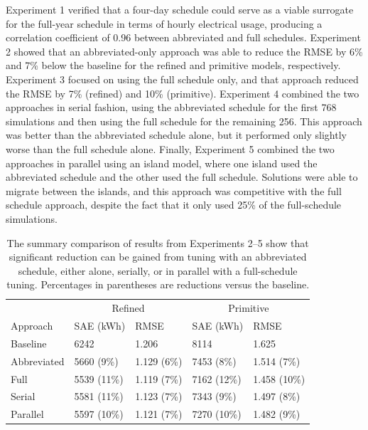 \documentclass[preprint, review, 12pt]{elsarticle}
\begin{document}
Experiment 1 verified that a four-day schedule could serve as a viable surrogate for the full-year schedule in terms of hourly electrical usage, producing a correlation coefficient of 0.96 between abbreviated and full schedules. Experiment 2 showed that an abbreviated-only approach was able to reduce the RMSE by 6\% and 7\% below the baseline for the refined and primitive models, respectively. Experiment 3 focused on using the full schedule only, and that approach reduced the RMSE by 7\% (refined) and 10\% (primitive). Experiment 4 combined the two approaches in serial fashion, using the abbreviated schedule for the first 768 simulations and then using the full schedule for the remaining 256. This approach was better than the abbreviated schedule alone, but it performed only slightly worse than the full schedule alone. Finally, Experiment 5 combined the two approaches in parallel using an island model, where one island used the abbreviated schedule and the other used the full schedule. Solutions were able to migrate between the islands, and this approach was competitive with the full schedule approach, despite the fact that it only used 25\% of the full-schedule simulations.


\begin{table}[tbp]
\centering
\caption{The summary comparison of results from Experiments 2--5 show that significant reduction can be gained from tuning with an abbreviated schedule, either alone, serially, or in parallel with a full-schedule tuning. Percentages in parentheses are reductions versus the baseline.}
\label{tab:hourly-summary}
\begin{tabular}{lllll}
\toprule
 &  \multicolumn{2}{c}{Refined} & \multicolumn{2}{c}{Primitive}\\
Approach & SAE (kWh) & RMSE & SAE (kWh) & RMSE \\
\midrule
Baseline    & 6242        & 1.206       & 8114        & 1.625 \\\rowcolor{DarkRow}
Abbreviated & 5660 (9\%)  & 1.129 (6\%) & 7453 (8\%)  & 1.514 (7\%)\\
Full        & 5539 (11\%) & 1.119 (7\%) & 7162 (12\%) & 1.458 (10\%)\\\rowcolor{DarkRow}
Serial      & 5581 (11\%) & 1.123 (7\%) & 7343 (9\%)  & 1.497 (8\%)\\
Parallel    & 5597 (10\%) & 1.121 (7\%) & 7270 (10\%) & 1.482 (9\%)\\
\bottomrule
\end{tabular}
\end{table}
\end{document}
